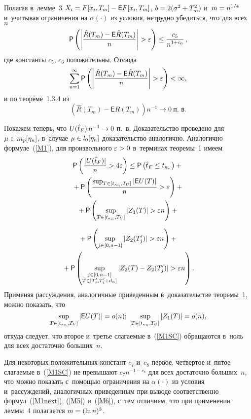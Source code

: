 \begin{multicols}{2}
Полагая в~лемме~3 $X_i \hm= F[x_i, T_m] \hm- {\mathsf E} F[x_i, T_m]$, $b \hm= 
2(\sigma^2\hm+T_m^2)$ и~$m \hm= n^{1/4}$ и~учитывая ограничения на $\alpha(\cdot)$ из 
условия, нетрудно убедиться, что для всех~$n$
$$
{\sf P} \left(\left| \displaystyle\frac{\displaystyle \hat{R}(T_m)-{\mathsf E} \hat{R}(T_m)\mathstrut}{\displaystyle n\mathstrut}\right| >\varepsilon \right) 
\leq \displaystyle\frac{\displaystyle c_5\mathstrut}{\displaystyle n^{1+c_6}\mathstrut}\,, 
$$
где константы $c_5$, $c_6$ положительны. Отсюда
$$
\sum\limits_{n=1}^{\infty}{\sf P} \left(\left|\displaystyle\frac{\displaystyle \hat{R}(T_m)-{\mathsf E} 
\hat{R}(T_m)\mathstrut}{\displaystyle n\mathstrut}\right| >\varepsilon \right) < \infty,
$$
и по теореме~1.3.4 из~\cite{Serfling2002} 
$$
\left(\hat{R}(T_m)-{\mathsf E}\hat{R}(T_m)\right)n^{-1} \to 0~\mbox{п.~в.}
$$



Покажем теперь, что  $U(\hat{t}_F) \, n^{-1}\hm \to 0$ п.~в. Доказательство 
проведено для $\mu \hm\in m_p[\eta_n]$, в~случае $\mu\hm \in l_0[\eta_n]$ 
доказательство аналогично.
Аналогично формуле~(\ref{M1}), для произвольного $\eps\hm>0$ в~терминах тео\-ре\-мы~1 имеем
\begin{multline*}
{\sf P} \left( \displaystyle\frac{\displaystyle |U(\hat{t}_F)|\mathstrut}{\displaystyle n\mathstrut}> 4\varepsilon \right) \leq {\sf P}\left(\hat{t}_F 
\leq t_{\kappa_n}\right) +{}\\
{}+ {\sf P}\left(\displaystyle\frac{\displaystyle \sup\nolimits_{T\in [t_{\kappa_n}, T_U]} |{\mathsf E} 
U(T)|\mathstrut}{\displaystyle n\mathstrut}>\varepsilon\right)+{}\\
{}+ {\sf P} \left(\sup\limits_{T\in [t_{\kappa_n}, T_U]} |Z_1(T)| > \varepsilon n\right) +{}
\end{multline*}

\noindent
\begin{multline}
{}+ {\sf P}  \left(\sup\limits_{j \in [0, n-1]} |Z_2(T_j^{\prime})| > \varepsilon n\right) +{}\\
{}+ {\sf P} \left(\sup\limits_{\substack{j \in [0, n-1] \\ T\in 
[T_j^{\prime},T_j^{\prime}+d_n]}} |Z_2(T)-Z_2(T_j^{\prime})| > \varepsilon n\right).
\label{M1SC}
\end{multline}
Применяя рассуждения, аналогичные приведенным в~доказательстве теоремы~1, можно показать, что
$$
\sup\limits_{T\in [t_{\kappa_n}, T_U]} |{\mathsf E} U(T)| = o(n); \enskip
\sup\limits_{T\in [t_{\kappa_n}, T_U]} |Z_1(T)|  = o(n),
$$
откуда следует, что второе и~третье слагаемые в~(\ref{M1SC}) обращаются в~ноль 
для всех достаточно больших~$n$.

Для некоторых положительных констант  $c_7$ и~$c_8$ первое, четвертое и~пятое 
слагаемые  в~(\ref{M1SC}) не превышают $c_7 n^{-1-c_8}$ для всех достаточно 
боль\-ших~$n$, что можно показать с~помощью ограничения на $\alpha(\cdot)$ из 
условия и~рассуждений, аналогичных приведенным при выводе соответственно формул~(\ref{M1next}), (\ref{M5}) и~(\ref{M6}), с~тем отличием, что при применении 
леммы~4 полагается $m \hm= (\ln n)^3$.


\end{multicols}
